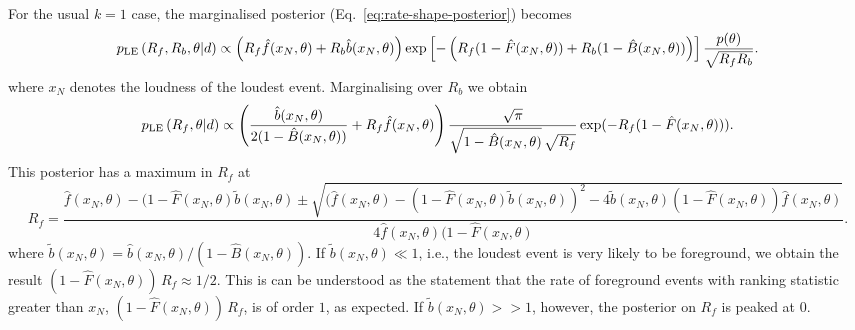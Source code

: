 \documentclass[aps,prd]{revtex4-1}
\begin{document}
For the usual $k=1$ case, the marginalised posterior (Eq.~\eqref{eq:rate-shape-posterior}) becomes
\begin{equation}
p_{\rm LE}\left( R_f, R_b, \theta | d \right) \propto \left(R_f \hat{f}(x_N,\theta) + R_b \hat{b}(x_N,\theta)\right)\exp\left[-\left( R_f (1-\hat{F}(x_N,\theta)) +
      R_b (1-\hat{B}(x_N,\theta)) \right) \right] \frac{p(\theta)}{\sqrt{R_f R_b}}.
\end{equation}
where $x_N$ denotes the loudness of the loudest event. Marginalising over $R_b$ we obtain
\begin{equation}
p_{\rm LE}\left( R_f, \theta | d \right) \propto \left( \frac{\hat{b}(x_N,\theta)}{2(1-\hat{B}(x_N,\theta))} + R_f \hat{f}(x_N,\theta)\right)\frac{\sqrt{\pi}}{\sqrt{1-\hat{B}(x_N,\theta)}\,\sqrt{R_f}} \exp(-R_f(1-\hat{F}(x_N,\theta))) .
\end{equation}
This posterior has a maximum in $R_f$ at
\begin{equation}
R_f = \frac{\hat{f}(x_N,\theta)-(1-\hat{F}(x_N,\theta)\tilde{b}(x_N,\theta) \pm \sqrt{(\hat{f}(x_N,\theta)-(1-\hat{F}(x_N,\theta)\tilde{b}(x_N,\theta))^2 - 4\tilde{b}(x_N,\theta)(1-\hat{F}(x_N,\theta))\hat{f}(x_N,\theta)}}{4 \hat{f}(x_N,\theta)(1-\hat{F}(x_N,\theta)}.
\end{equation}
where $\tilde{b}(x_N,\theta) =\hat{b}(x_N,\theta)/(1-\hat{B}(x_N,\theta))$. If $\tilde{b}(x_N,\theta) \ll 1$, i.e., the loudest event is very likely to be foreground, we obtain the result $(1- \hat{F}(x_N,\theta))\,R_f \approx 1/2$. This is can be understood as the statement that the rate of foreground events with ranking statistic greater than $x_N$,  $(1- \hat{F}(x_N,\theta))\,R_f$, is of order $1$, as expected. If $\tilde{b}(x_N,\theta) >> 1$, however, the posterior on $R_f$ is peaked at $0$.
\end{document}
